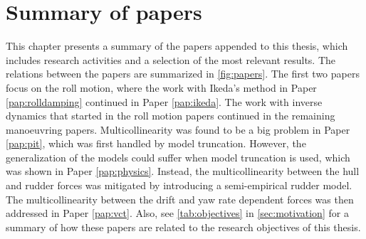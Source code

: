 \chapter{Summary of papers}\label{ch:results}
\noindent This chapter presents a summary of the papers appended to this thesis, which includes research activities and a selection of the most relevant results. The relations between the papers are summarized in \autoref{fig:papers}. The first two papers focus on the roll motion, where the work with Ikeda's method in Paper \ref{pap:rolldamping} continued in Paper \ref{pap:ikeda}. 
The work with inverse dynamics that started in the roll motion papers continued in the remaining manoeuvring papers.
Multicollinearity was found to be a big problem in Paper \ref{pap:pit}, which was first handled by model truncation.
However, the generalization of the models could suffer when model truncation is used, which was shown in Paper \ref{pap:physics}. Instead, the multicollinearity between the hull and rudder forces was mitigated by introducing a semi-empirical rudder model. The multicollinearity between the drift and yaw rate dependent forces was then addressed in Paper \ref{pap:vct}. Also, see \autoref{tab:objectives} in \autoref{sec:motivation} for a summary of how these papers are related to the research objectives of this thesis.
